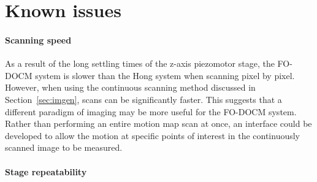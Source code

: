 

\section{Known issues}
\label{sec:known_issues}

\paragraph{Scanning speed}

As a result of the long settling times of the z-axis piezomotor stage, the FO-DOCM system is slower than the Hong system when scanning pixel by pixel. However, when using the continuous scanning method discussed in Section~\ref{sec:imgen}, scans can be significantly faster. This suggests that a different paradigm of imaging may be more useful for the FO-DOCM system. Rather than performing an entire motion map scan at once, an interface could be developed to allow the motion at specific points of interest in the continuously scanned image to be measured.


\paragraph{Stage repeatability}


